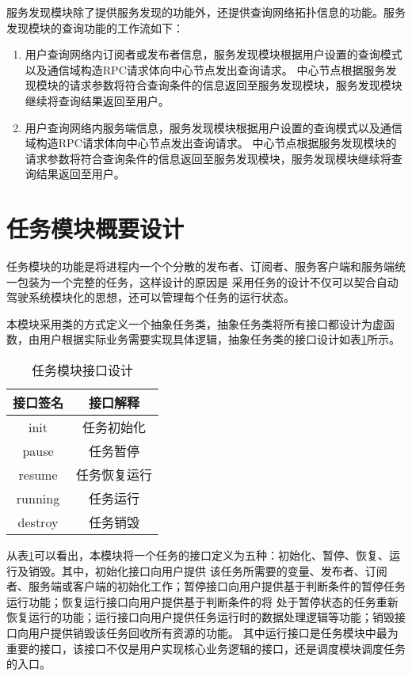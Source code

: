 服务发现模块除了提供服务发现的功能外，还提供查询网络拓扑信息的功能。服务发现模块的查询功能的工作流如下：
\begin{enumerate}
  \item 用户查询网络内订阅者或发布者信息，服务发现模块根据用户设置的查询模式以及通信域构造RPC请求体向中心节点发出查询请求。
  中心节点根据服务发现模块的请求参数将符合查询条件的信息返回至服务发现模块，服务发现模块继续将查询结果返回至用户。
  \item 用户查询网络内服务端信息，服务发现模块根据用户设置的查询模式以及通信域构造RPC请求体向中心节点发出查询请求。
  中心节点根据服务发现模块的请求参数将符合查询条件的信息返回至服务发现模块，服务发现模块继续将查询结果返回至用户。
\end{enumerate}

\section{任务模块概要设计}
任务模块的功能是将进程内一个个分散的发布者、订阅者、服务客户端和服务端统一包装为一个完整的任务，这样设计的原因是
采用任务的设计不仅可以契合自动驾驶系统模块化的思想，还可以管理每个任务的运行状态。

本模块采用类的方式定义一个抽象任务类，抽象任务类将所有接口都设计为虚函数，由用户根据实际业务需要实现具体逻辑，抽象任务类的接口设计如表\ref{task_jiekou}所示。
\begin{table}[htb]
  \centering\small
  \caption{任务模块接口设计}
  \label{task_jiekou}
  \begin{tabular}{cc}
    \toprule
    接口签名 & 接口解释 \\
    \midrule
    init & 任务初始化 \\
    pause & 任务暂停\\
    resume & 任务恢复运行\\
    running & 任务运行\\
    destroy & 任务销毁\\
    \bottomrule
  \end{tabular}
\end{table}

从表\ref{task_jiekou}可以看出，本模块将一个任务的接口定义为五种：初始化、暂停、恢复、运行及销毁。其中，初始化接口向用户提供
该任务所需要的变量、发布者、订阅者、服务端或客户端的初始化工作；暂停接口向用户提供基于判断条件的暂停任务运行功能；恢复运行接口向用户提供基于判断条件的将
处于暂停状态的任务重新恢复运行的功能；运行接口向用户提供任务运行时的数据处理逻辑等功能；销毁接口向用户提供销毁该任务回收所有资源的功能。
其中运行接口是任务模块中最为重要的接口，该接口不仅是用户实现核心业务逻辑的接口，还是调度模块调度任务的入口。

